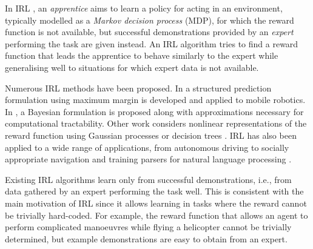 \documentclass[a4paper,11pt]{report}
\begin{document}
In IRL \cite{ng2000algorithms}, an \emph{apprentice} aims to learn a policy for acting in an environment, typically modelled as a \emph{Markov decision process} (MDP), for which the reward function is not available, but successful demonstrations provided by an \emph{expert} performing the task are given instead. An IRL algorithm tries to find a reward function that leads the apprentice to behave  similarly to the expert while generalising well to situations for which expert data is not available. 


Numerous IRL methods have been proposed. In \cite{ratliff2006maximum} a structured prediction formulation using maximum margin is developed and applied to mobile robotics. In \cite{ramachandran2007bayesian},  a  Bayesian formulation is proposed along with approximations necessary for computational tractability. Other work considers nonlinear representations of the reward function using Gaussian processes \cite{levine2011nonlinear} or decision trees \cite{ratliff2007boosting}. IRL has also been applied to a wide range of applications, from  autonomous driving \cite{abbeel2004apprenticeship,kuderer2015learning} to socially appropriate navigation \cite{henry2010learning,vasquez2014inverse} and training parsers for natural language processing \cite{neu2009training}.


Existing IRL algorithms learn only from successful demonstrations, i.e., from data gathered by an expert performing the task well. This is consistent with the main motivation of IRL since it allows learning in tasks where the reward cannot be trivially hard-coded.  For example, the reward function that allows an agent to perform complicated manoeuvres while flying a helicopter cannot be trivially determined, but example demonstrations are easy to obtain from an expert.
\end{document}
